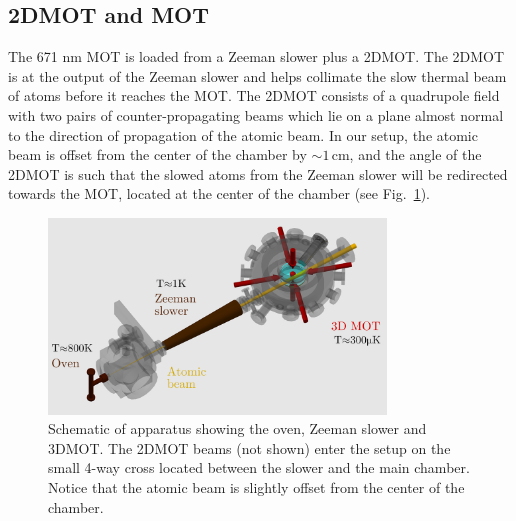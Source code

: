 \subsection{2DMOT and MOT}
The 671 nm MOT is loaded from a Zeeman slower plus a 2DMOT. The 2DMOT is at the
output of the Zeeman slower and helps collimate the slow thermal beam of atoms
before it reaches the MOT.   The 2DMOT consists of a quadrupole field with two
pairs of counter-propagating beams which lie on a plane almost normal to the
direction of propagation of the atomic beam.   In our setup, the atomic beam is
offset from the center of the chamber by $\sim1\,$cm, and the angle of the
2DMOT is such that the slowed atoms from the Zeeman slower will be redirected
towards the MOT, located at the center of the chamber (see
Fig.~\ref{fig:apparatus-schem}). 
\begin{figure}
\centering
\includegraphics[width=0.8\textwidth]{../masters-figures/apparatus-schem.png}
\caption[Apparatus schematic ]{\small Schematic of apparatus showing the oven,
Zeeman slower and 3DMOT.  The 2DMOT beams (not shown) enter the setup on the
small 4-way cross located between the slower and the main chamber. Notice that
the atomic beam is slightly offset from the center of the chamber. }
\label{fig:apparatus-schem} 
\end{figure} 

